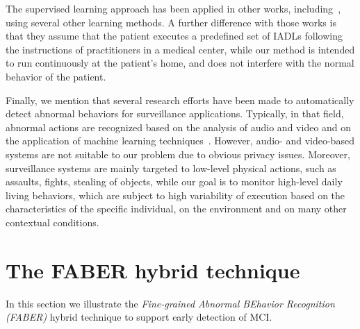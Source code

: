 \documentclass[10pt, conference, compsocconf]{IEEEtran}
\begin{document}
The supervised learning approach has been applied in other works, including~\cite{DCS13b,DCP11,CS09}, using several other learning methods. A further difference  with those works is that they assume that the patient executes a predefined set of IADLs following the instructions of practitioners in a medical center, while our method is intended to run continuously at the patient's home, and does not interfere with the normal behavior of the patient.

Finally, we mention that several research efforts have been made to automatically detect abnormal behaviors for surveillance applications. Typically, in that field, abnormal actions are recognized based on the analysis of audio and video and on the application of machine learning techniques~\cite{OW12}. However, audio- and video-based systems are not suitable to our problem due to obvious privacy issues. Moreover, surveillance systems are mainly targeted to low-level physical actions, such as assaults, fights, stealing of objects, while our goal is to monitor high-level daily living behaviors, which are subject to high variability of execution based on the characteristics of the specific individual, on the environment and on many other contextual conditions. 

















 


\section{The FABER hybrid technique}
\label{sec:technique}
In this section we illustrate the \emph{Fine-grained Abnormal 
BEhavior Recognition (FABER)} hybrid technique to support
early detection of MCI.
\end{document}
